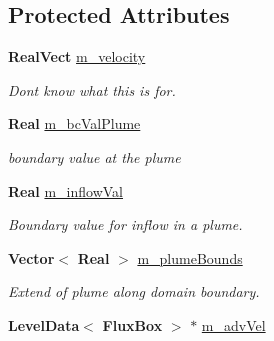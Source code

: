 \subsection*{Protected Attributes}
\begin{DoxyCompactItemize}
\item 
\mbox{\label{class_advect_i_b_c_a7d844d0407883309028ab564f3b20261}} 
\textbf{ Real\+Vect} \hyperlink{class_advect_i_b_c_a7d844d0407883309028ab564f3b20261}{m\+\_\+velocity}
\begin{DoxyCompactList}\small\item\em Don\textquotesingle{}t know what this is for. \end{DoxyCompactList}\item 
\mbox{\label{class_advect_i_b_c_a5737cd993143b522c10599caa94e849f}} 
\textbf{ Real} \hyperlink{class_advect_i_b_c_a5737cd993143b522c10599caa94e849f}{m\+\_\+bc\+Val\+Plume}
\begin{DoxyCompactList}\small\item\em boundary value at the plume \end{DoxyCompactList}\item 
\mbox{\label{class_advect_i_b_c_aeb567fe955fff5c26c250a77b1bd2762}} 
\textbf{ Real} \hyperlink{class_advect_i_b_c_aeb567fe955fff5c26c250a77b1bd2762}{m\+\_\+inflow\+Val}
\begin{DoxyCompactList}\small\item\em Boundary value for inflow in a plume. \end{DoxyCompactList}\item 
\mbox{\label{class_advect_i_b_c_a4149bd47a240acfc4de71ff74e10df1d}} 
\textbf{ Vector}$<$ \textbf{ Real} $>$ \hyperlink{class_advect_i_b_c_a4149bd47a240acfc4de71ff74e10df1d}{m\+\_\+plume\+Bounds}
\begin{DoxyCompactList}\small\item\em Extend of plume along domain boundary. \end{DoxyCompactList}\item 
\mbox{\label{class_advect_i_b_c_a2fd99ddeaa84fbadf49657de8491998f}} 
\textbf{ Level\+Data}$<$ \textbf{ Flux\+Box} $>$ $\ast$ \hyperlink{class_advect_i_b_c_a2fd99ddeaa84fbadf49657de8491998f}{m\+\_\+adv\+Vel}

\end{DoxyCompactItemize}
